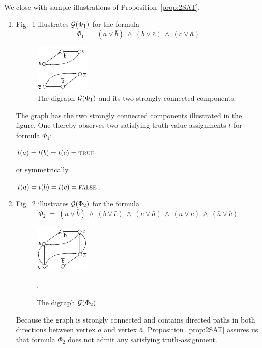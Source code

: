 \medskip

\noindent We close with sample illustrations of Proposition~\ref{prop:2SAT}.
\begin{enumerate}
\item
Fig.~\ref{2SATyes} illustrates $\mbox{$\cal G$}(\Phi_1)$ for the formula
\[ \Phi_1 \ = \ (a \vee \bar{b}) \ \wedge \ (b \vee \bar{c}) \ \wedge \ (c \vee \bar{a})
\]
\begin{figure}[htb]
\begin{center}
\includegraphics[width=0.25\textwidth]{FiguresGraph/2SATyes.png}
\caption{The digraph $\mbox{$\cal G$}(\Phi_1)$ and its two strongly connected components.}
\label{2SATyes}
\end{center}
\end{figure}
The graph has the two strongly connected components illustrated in the figure.  One thereby observes two satisfying truth-value assignments $t$ for formula $\Phi_1$:

\hspace*{.2in} $t(a) = t(b) = t(c) = \mbox{\sc true}$

or symmetrically

\hspace*{.2in} $t(a) = t(b) = t(c) = \mbox{\sc false}$.

\item
Fig.~\ref{2SATno} illustrates $\mbox{$\cal G$}(\Phi_2)$ for the formula
\[ \Phi_2 \ = \ (a \vee \bar{b}) \ \wedge \ (b \vee \bar{c}) \ \wedge \ (c \vee \bar{a})
 \ \wedge \ (a \vee c) \ \wedge \ (\bar{a} \vee \bar{c})
\]
\begin{figure}[htb]
\begin{center}
\includegraphics[width=0.25\textwidth]{FiguresGraph/2SATno.png}
\caption{The digraph $\mbox{$\cal G$}(\Phi_2)$}. 
\label{2SATno}
\end{center}
\end{figure}
Because the graph is strongly connected and contains directed paths in both directions between vertex $a$ and vertex $\bar{a}$, Proposition~\ref{prop:2SAT} assures us that formula $\Phi_2$ does not admit any satisfying truth-assignment.
\end{enumerate}

